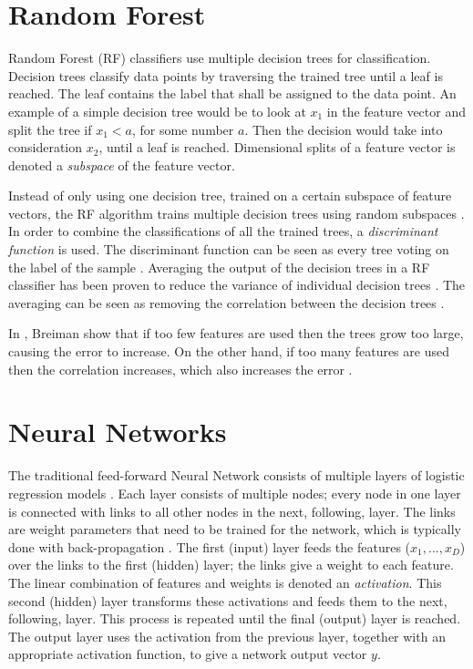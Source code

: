 \newpage
\section{Random Forest}
Random Forest (RF) classifiers use multiple decision trees for classification.
Decision trees classify data points by traversing the trained tree until a leaf is reached.
The leaf contains the label that shall be assigned to the data point.
An example of a simple decision tree would be to look at $x_1$ in the feature vector and split the tree if $x_1 < a$, for some number $a$.
Then the decision would take into consideration $x_2$, until a leaf is reached.
Dimensional splits of a feature vector is denoted a \textit{subspace} of the feature vector.

Instead of only using one decision tree, trained on a certain subspace of feature vectors, the RF algorithm trains multiple decision trees \cite{Breiman2001, Ho1995} using random subspaces \cite{Ho1998}.
In order to combine the classifications of all the trained trees, a \textit{discriminant function} is used.
The discriminant function can be seen as every tree voting on the label of the sample \cite{Breiman2001}.
Averaging the output of the decision trees in a RF classifier has been proven to reduce the variance of individual decision trees \cite{Breiman2001}.
The averaging can be seen as removing the correlation between the decision trees \cite{Ho1998}.

In \cite{Breiman2001}, Breiman show that if too few features are used then the trees grow too large, causing the error to increase. 
On the other hand, if too many features are used then the correlation increases, which also increases the error \cite{Breiman2001}.

\section{Neural Networks}
\label{sec:nn}
The traditional feed-forward Neural Network consists of multiple layers of logistic regression models \cite{Bishop2006}.
Each layer consists of multiple nodes; every node in one layer is connected with links to all other nodes in the next, following, layer.
The links are weight parameters that need to be trained for the network, which is typically done with back-propagation \cite{Bishop2006}.
The first (input) layer feeds the features ($x_1, ..., x_D$) over the links to the first (hidden) layer; the links give a weight to each feature.
The linear combination of features and weights is denoted an \textit{activation}.
This second (hidden) layer transforms these activations and feeds them to the next, following, layer.
This process is repeated until the final (output) layer is reached.
The output layer uses the activation from the previous layer, together with an appropriate activation function, to give a network output vector $y$.

